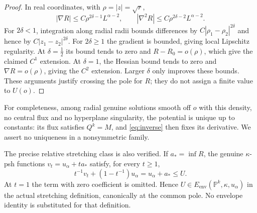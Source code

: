 \documentclass[11pt]{article}
\newcommand{\PP}{\mathbb P}
\theoremstyle{remark}\newtheorem{remark}[theorem]{Remark}
\begin{document}
\begin{proof}
In real coordinates, with $\rho=|z|=\sqrt r$,
\[
 |\nabla R|\le C\rho^{2\delta-1}L^{\alpha-2},
 \qquad |\nabla^2R|\le C\rho^{2\delta-2}L^{\alpha-2}.
\]
For $2\delta<1$, integration along radial radii bounds differences
by $C|\rho_1-\rho_2|^{2\delta}$ and hence by
$C|z_1-z_2|^{2\delta}$. For $2\delta\ge1$ the gradient is bounded,
giving local Lipschitz regularity. At $\delta=\frac12$ its bound
tends to zero and $R-R_0=o(\rho)$, which give the claimed $C^1$
extension. At $\delta=1$, the Hessian bound tends to zero and
$\nabla R=o(\rho)$, giving the $C^2$ extension. Larger $\delta$
only improves these bounds. These arguments justify crossing the
pole for $R$; they do not assign a finite value to $U(o)$.
\end{proof}

For completeness, among radial genuine solutions smooth off $o$
with this density, no central flux and no hyperplane singularity,
the potential is unique up to constants: its flux satisfies
$Q^k=M$, and \eqref{eq:inverse} then fixes its derivative.
We assert no uniqueness in a nonsymmetric family.

The precise relative stretching class is also verified. If
$a_* =\inf R$, the genuine $\kappa$-psh functions
$v_t=u_\alpha+t a_*$ satisfy, for every $t\ge1$,
\[
 t^{-1}v_t+(1-t^{-1})u_\alpha=u_\alpha+a_*\le U.
\]
At $t=1$ the term with zero coefficient is omitted. Hence
$U\in E_{\mathrm{env}}(\PP^k,\kappa,u_\alpha)$ in the actual
stretching definition, canonically at the common pole.
No envelope identity is substituted for that definition.
\end{document}
